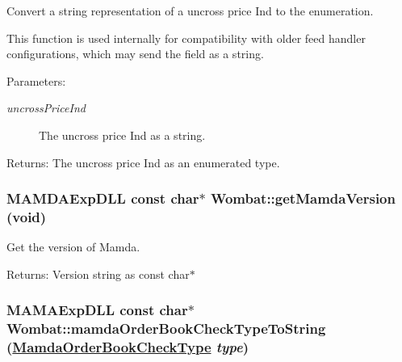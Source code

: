 Convert a string representation of a uncross price Ind to the enumeration. 

This function is used internally for compatibility with older feed handler configurations, which may send the field as a string.

\begin{Desc}
\item[Parameters:]
\begin{description}
\item[{\em uncross\-Price\-Ind}]The uncross price Ind as a string.\end{description}
\end{Desc}
\begin{Desc}
\item[Returns:]The uncross price Ind as an enumerated type. \end{Desc}
\hypertarget{namespaceWombat_85df7924b251ca3abfd56daf6e6973f5}{
\subsubsection[getMamdaVersion]{\setlength{\rightskip}{0pt plus 5cm}MAMDAExp\-DLL const char$\ast$ Wombat::get\-Mamda\-Version (void)}}
\label{namespaceWombat_85df7924b251ca3abfd56daf6e6973f5}


Get the version of Mamda. 

\begin{Desc}
\item[Returns:]Version string as const char$\ast$ \end{Desc}
\hypertarget{namespaceWombat_441a98871ef122eac7809d75d9e054fd}{
\subsubsection[mamdaOrderBookCheckTypeToString]{\setlength{\rightskip}{0pt plus 5cm}MAMAExp\-DLL const char$\ast$ Wombat::mamda\-Order\-Book\-Check\-Type\-To\-String (\hyperlink{namespaceWombat_6f15e7af875f3469c5fb0afe58b21667}{Mamda\-Order\-Book\-Check\-Type} {\em type})}}
\label{namespaceWombat_441a98871ef122eac7809d75d9e054fd}


